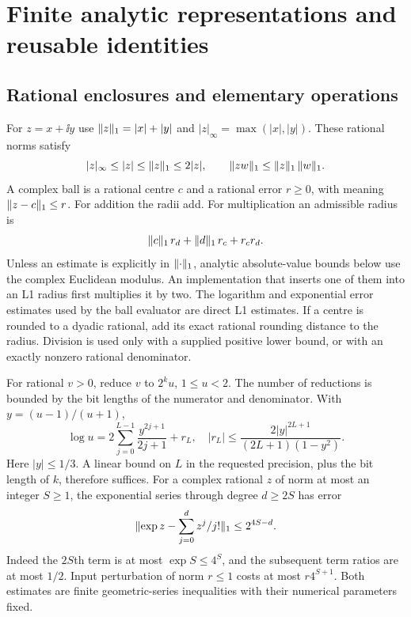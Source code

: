 \section{Finite analytic representations and reusable identities}
\label{sec:analytic}

\subsection{Rational enclosures and elementary operations}
For $z=x+\ii y$ use
$\lVert z\rVert_1=|x|+|y|$ and $|z|_\infty=\max(|x|,|y|)$.
These rational norms satisfy
\[
 |z|_\infty\le |z|\le\lVert z\rVert_1\le2|z|,
 \qquad \lVert zw\rVert_1\le\lVert z\rVert_1\,\lVert w\rVert_1.
\]
A complex ball is a rational centre $c$ and a rational error $r\ge0$,
with meaning $\lVert z-c\rVert_1\le r$. For addition the radii add. For
multiplication an admissible radius is
\begin{equation}
 \lVert c\rVert_1\,r_d+\lVert d\rVert_1\,r_c+r_cr_d.
 \label{eq:ballproduct}
\end{equation}
Unless an estimate is explicitly in $\lVert \cdot\rVert_1$, analytic
absolute-value bounds below use the complex Euclidean modulus. An
implementation that inserts one of them into an L1 radius first
multiplies it by two. The logarithm and exponential error estimates
used by the ball evaluator are direct L1 estimates.
If a centre is rounded to a dyadic rational, add its exact rational
rounding distance to the radius. Division is used only with a supplied
positive lower bound, or with an exactly nonzero rational denominator.

For rational $v>0$, reduce $v$ to $2^ku$, $1\le u<2$. The number of
reductions is bounded by the bit lengths of the numerator and denominator.
With $y=(u-1)/(u+1)$,
\begin{equation}
 \log u=2\sum_{j=0}^{L-1}\frac{y^{2j+1}}{2j+1}+r_L,
 \quad
 |r_L|\le\frac{2|y|^{2L+1}}{(2L+1)(1-y^2)}.
 \label{eq:log-series}
\end{equation}
Here $|y|\le1/3$. A linear bound on $L$ in the requested precision,
plus the bit length of $k$, therefore suffices. For a complex rational
$z$ of norm at most an integer $S\ge1$, the exponential series through
degree $d\ge2S$ has error
\begin{equation}
 \lVert \exp z-\sum_{j=0}^d z^j/j!\rVert_1\le 2^{4S-d}.
 \label{eq:exp-series}
\end{equation}
Indeed the $2S$th term is at most $\exp S\le4^S$, and the subsequent
term ratios are at most $1/2$. Input perturbation of norm $r\le1$
costs at most $r4^{S+1}$. Both estimates are finite geometric-series
inequalities with their numerical parameters fixed.

